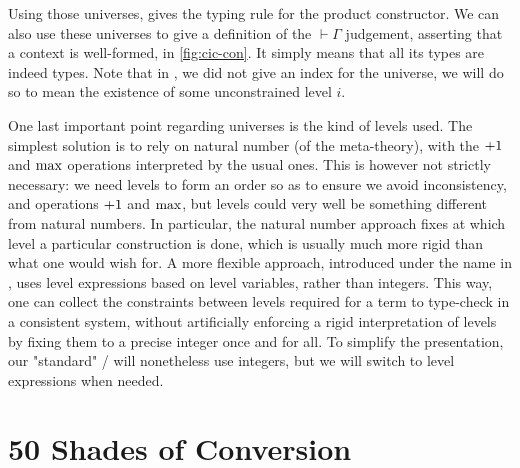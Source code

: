 Using those universes,  gives the typing rule for the product constructor. We can also use these universes to give a definition of the $\vdash \Gamma$
judgement, asserting that a context is well-formed, in \cref{fig:cic-con}.
It simply means that all its types
are indeed types. Note that in , we did not give an index for the
universe, we will do so to mean the existence of some unconstrained level $i$.

One last important point regarding universes is the kind of levels used. The simplest solution
is to rely on natural number (of the meta-theory), with the $+1$
and $\max$ operations interpreted by the usual ones.
This is however not strictly necessary: we need levels
to form an order so as to ensure we avoid inconsistency, and operations $+1$ and
$\max$, but levels could very well be something different from natural numbers.
In particular, the natural number approach fixes at which level a particular construction
is done, which is usually much more rigid than what one would wish for.
A more flexible approach, introduced under the name  in
, uses level expressions based on level variables, rather than integers.
This way, one can collect the constraints between levels required for a
term to type-check in a consistent system, without artificially enforcing a
rigid interpretation of levels by fixing them to a precise integer once and for all.
To simplify the presentation, our "standard" / will nonetheless use integers,
but we will switch to level expressions when needed.

\section{50 Shades of Conversion}
\label{sec:tech-conversion}

